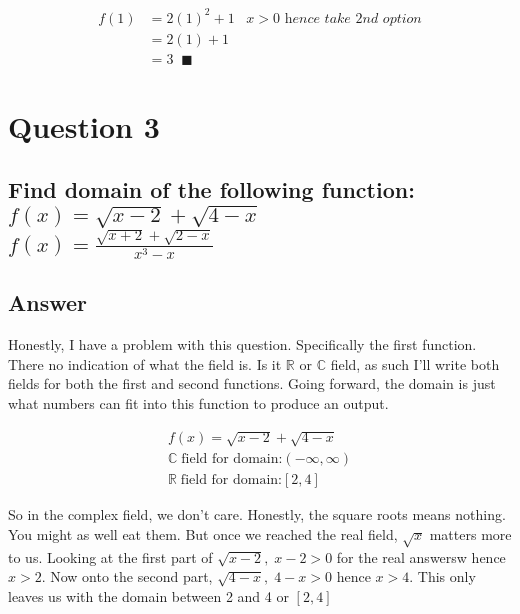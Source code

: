 \documentclass[17 pt]{extarticle}
\begin{document}
        \begin{equation*}
            \begin{split}
                f(1) &= 2(1)^2 + 1 \; \; \; \textit{$x > 0$ hence take 2nd option} \\
                &= 2(1) + 1 \\
                &= 3 \; \; \blacksquare
            \end{split}
            \end{equation*}
\section{Question 3}

\subsection*{Find domain of the following function: \newline \\ $f(x) =\sqrt{x-2} + \sqrt{4-x}$
\newline \\ $f(x) = \frac{\sqrt{x+2} + \sqrt{2-x}}{x^3-x}$}

\vspace{10mm}
\subsection*{Answer}

Honestly, I have a problem with this question. Specifically the first function. There no indication of what the field is. Is it $\mathbb{R}$ or $\mathbb{C}$ field, as 
such I'll write both fields for both the first and second functions. Going forward, the domain is just what numbers can fit into this function to produce an output. 

\begin{equation*}
    \begin{split}
        f(x) =\sqrt{x-2} + \sqrt{4-x} \\
        \mathbb{C} \; \text{field for domain:} (- \infty, \infty) \\
        \mathbb{R} \; \text{field for domain:} [2,4]
    \end{split}
    \end{equation*}

So in the complex field, we don't care. Honestly, the square roots means nothing. You might as well eat them. But once we reached the 
real field, $\sqrt{x}$ matters more to us. Looking at the first part of $\sqrt{x-2}, \; x-2 > 0$ for the real answersw hence $x>2$. Now onto the second part, $\sqrt{4-x}, \;
4-x > 0$ hence $x>4$. This only leaves us with the domain between 2 and 4 or $ [2,4] $
\end{document}
